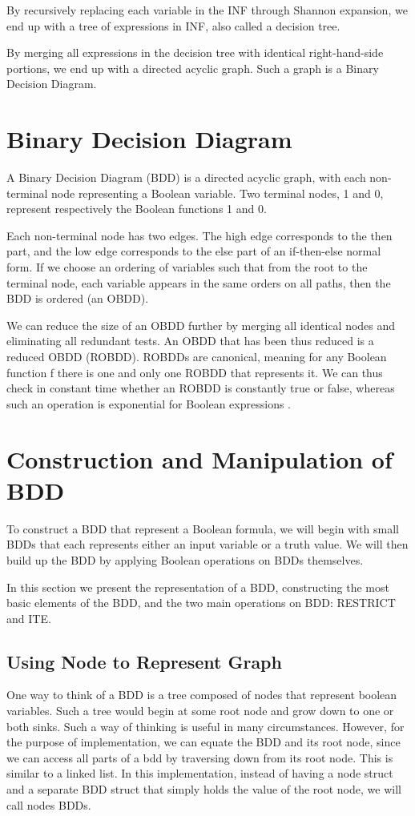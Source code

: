 \documentclass[12pt]{article}
\begin{document}
By recursively replacing each variable in the INF through Shannon expansion, we end up with a tree of expressions in INF, also called a decision tree.

By merging all expressions in the decision tree with identical right-hand-side portions, we end up with a directed acyclic graph.
Such a graph is a Binary Decision Diagram.

	
\section{Binary Decision Diagram}
A Binary Decision Diagram (BDD) is a directed acyclic graph, with each non-terminal node representing a Boolean variable.
Two terminal nodes, 1 and 0, represent respectively the Boolean functions 1 and 0. 

Each non-terminal node has two edges.
The high edge corresponds to the then part, and the low edge corresponds to the else part of an if-then-else normal form.
If we choose an ordering of variables such that from the root to the terminal node, each variable appears in the same orders on all paths, then the BDD is ordered (an OBDD).

We can reduce the size of an OBDD further by merging all identical nodes and eliminating all redundant tests.
An OBDD that has been thus reduced is a reduced OBDD (ROBDD).
ROBDDs are canonical, meaning for any Boolean function f there is one and only one ROBDD that represents it.
We can thus check in constant time whether an ROBDD is constantly true or false, whereas such an operation is exponential for Boolean expressions \cite{andersen99}.


\section{Construction and Manipulation of BDD}
To construct a BDD that represent a Boolean formula, we will begin with small BDDs that each represents either an input variable or a truth value. We will then build up the BDD by applying Boolean operations on BDDs themselves.

In this section we present the representation of a BDD, constructing the most basic elements of the BDD, and the two main operations on BDD: RESTRICT and ITE.

\subsection{Using Node to Represent Graph}
One way to think of a BDD is a tree composed of nodes that represent boolean variables. Such a tree would begin at some root node and grow down to one or both sinks. 
Such a way of thinking is useful in many circumstances. However, for the purpose of implementation, we can equate the BDD and its root node, since we can access all parts of a bdd by traversing down from its root node. This is similar to a linked list.
In this implementation, instead of having a node struct and a separate BDD struct that simply holds the value of the root node, we will call nodes BDDs. 
\end{document}
